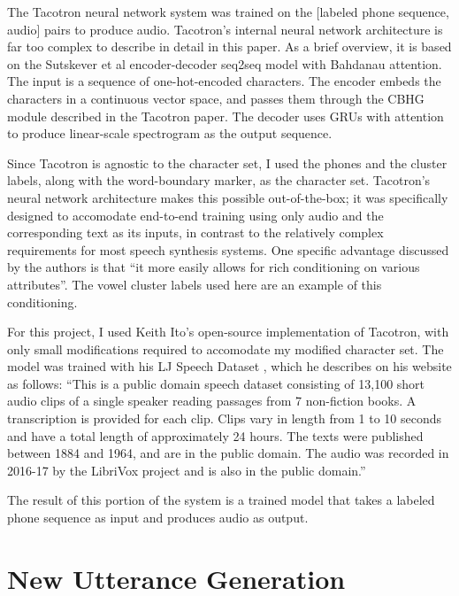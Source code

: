 \documentclass{article}
\begin{document}
The Tacotron \cite{wang2017tacotron} neural network system was trained on the [labeled phone sequence, audio] pairs to produce audio.
Tacotron's internal neural network architecture is far too complex to describe in detail in this paper. As a brief overview, it is based on the Sutskever et al \cite{sutskever2014sequence} encoder-decoder seq2seq model with Bahdanau \cite{bahdanau2014neural} attention. The input is a sequence of one-hot-encoded characters.
The encoder embeds the characters in a continuous vector space, and passes them through the CBHG module described in the Tacotron paper.
The decoder uses GRUs with attention to produce linear-scale spectrogram as the output sequence.

Since Tacotron is agnostic to the character set, I used the phones and the cluster labels, along with the word-boundary marker, as the character set. Tacotron's neural network architecture makes this possible out-of-the-box; it was specifically designed to accomodate end-to-end training using only audio and the corresponding text as its inputs, in contrast to the relatively complex requirements for most speech synthesis systems.
One specific advantage discussed by the authors is that ``it more easily
allows for rich conditioning on various attributes''. The vowel cluster labels used here are an example of this conditioning.

For this project, I used Keith Ito's open-source implementation of Tacotron, with only small modifications required to accomodate my modified character set. The model was trained with his LJ Speech Dataset \cite{ljspeech17}, which he describes on his website as follows:
``This is a public domain speech dataset consisting of 13,100 short audio clips of a single speaker reading passages from 7 non-fiction books. A transcription is provided for each clip. Clips vary in length from 1 to 10 seconds and have a total length of approximately 24 hours. The texts were published between 1884 and 1964, and are in the public domain. The audio was recorded in 2016-17 by the LibriVox project and is also in the public domain.''

The result of this portion of the system is a trained model that takes a labeled phone sequence as input and produces audio as output.

\section{New Utterance Generation}
\label{sec:newuttgen}
\end{document}
